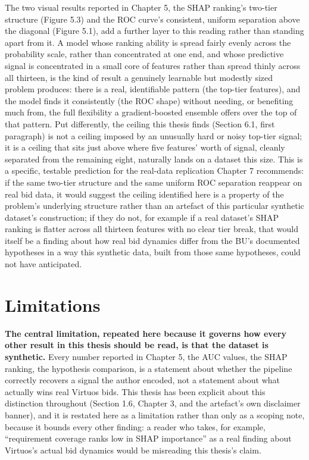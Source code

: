 The two visual results reported in Chapter 5, the SHAP ranking's
two-tier structure (Figure 5.3) and the ROC curve's consistent, uniform
separation above the diagonal (Figure 5.1), add a further layer to this
reading rather than standing apart from it. A model whose ranking
ability is spread fairly evenly across the probability scale, rather
than concentrated at one end, and whose predictive signal is
concentrated in a small core of features rather than spread thinly
across all thirteen, is the kind of result a genuinely learnable but
modestly sized problem produces: there is a real, identifiable pattern
(the top-tier features), and the model finds it consistently (the ROC
shape) without needing, or benefiting much from, the full flexibility a
gradient-boosted ensemble offers over the top of that pattern. Put
differently, the ceiling this thesis finds (Section 6.1, first
paragraph) is not a ceiling imposed by an unusually hard or noisy
top-tier signal; it is a ceiling that sits just above where five
features' worth of signal, cleanly separated from the remaining eight,
naturally lands on a dataset this size. This is a specific, testable
prediction for the real-data replication Chapter 7 recommends: if the
same two-tier structure and the same uniform ROC separation reappear on
real bid data, it would suggest the ceiling identified here is a
property of the problem's underlying structure rather than an artefact
of this particular synthetic dataset's construction; if they do not, for
example if a real dataset's SHAP ranking is flatter across all thirteen
features with no clear tier break, that would itself be a finding about
how real bid dynamics differ from the BU's documented hypotheses in a
way this synthetic data, built from those same hypotheses, could not
have anticipated.

\hypertarget{limitations}{%
\section{Limitations}\label{limitations}}

\textbf{The central limitation, repeated here because it governs how
every other result in this thesis should be read, is that the dataset is
synthetic.} Every number reported in Chapter 5, the AUC values, the SHAP
ranking, the hypothesis comparison, is a statement about whether the
pipeline correctly recovers a signal the author encoded, not a statement
about what actually wins real Virtuos bids. This thesis has been
explicit about this distinction throughout (Section 1.6, Chapter 3, and
the artefact's own disclaimer banner), and it is restated here as a
limitation rather than only as a scoping note, because it bounds every
other finding: a reader who takes, for example, ``requirement coverage
ranks low in SHAP importance'' as a real finding about Virtuos's actual
bid dynamics would be misreading this thesis's claim.

